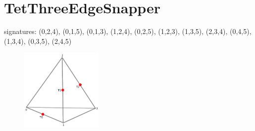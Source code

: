 \documentclass{article}
\begin{document}
\begin{figure}
\end{figure}

\setcounter{subfigure}{0}
\clearpage





\section{TetThreeEdgeSnapper}

signatures: (0,2,4), (0,1,5), (0,1,3), (1,2,4), (0,2,5), (1,2,3),
(1,3,5), (2,3,4), (0,4,5), (1,3,4), (0,3,5), (2,4,5)

\begin{figure}[h!]
\includegraphics[width=4cm]{TetThreeEdgeSnapper}
\end{figure}
\end{document}
